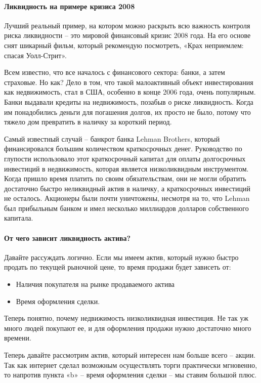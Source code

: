 \documentclass[a5paper]{article}
\begin{document}
\paragraph{Ликвидность на примере кризиса 2008}

Лучший реальный пример, на котором можно раскрыть всю важность контроля риска ликвидности – это мировой финансовый кризис 2008 года. На его основе снят шикарный фильм, который рекомендую посмотреть, «Крах неприемлем: спасая Уолл-Стрит».

Всем известно, что все началось с финансового сектора: банки, а затем страховые. Но как? Дело в том, что такой малоактивный объект инвестирования как недвижимость, стал в США, особенно в конце 2006 года, очень популярным. Банки выдавали кредиты на недвижимость, позабыв о риске ликвидность. Когда им понадобились деньги для погашения долгов, их просто не было, потому что тяжело дом превратить в наличку за короткий период.

Самый известный случай – банкрот банка Lehman Brothers, который финансировался большим количеством краткосрочных денег. Руководство по глупости использовало этот краткосрочный капитал для оплаты долгосрочных инвестиций в недвижимость, которая является низколиквидным инструментом. Когда пришло время платить по своим обязательствам, они не могли обратить достаточно быстро неликвидный актив в наличку, а краткосрочных инвестиций не осталось. Акционеры были почти уничтожены, несмотря на то, что Lehman был прибыльным банком и имел несколько миллиардов долларов собственного капитала.

\paragraph{От чего зависит ликвидность актива?}

Давайте рассуждать логично. Если мы имеем актив, который нужно быстро продать по текущей рыночной цене, то время продажи будет зависеть от:
\begin{itemize}
\item     Наличия покупателя на рынке продаваемого актива
\item     Время оформления сделки.
\end{itemize}

Теперь понятно, почему недвижимость низколиквидная инвестиция. Не так уж много людей покупают ее, и для оформления продажи нужно достаточно много времени.

Теперь давайте рассмотрим актив, который интересен нам больше всего – акции. Так как интернет сделал возможным осуществлять торги практически мгновенно, то напротив пункта «b» – время оформления сделки – мы ставим большой плюс.
\end{document}
